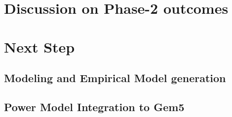 \documentclass[conference]{IEEEtran}
\begin{document}
\section{Discussion on Phase-2 outcomes}

\section{Next Step}

    \subsection{Modeling and Empirical Model generation}

    \subsection{Power Model Integration to Gem5}








\end{document}
